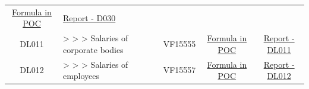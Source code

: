 \documentclass[]{book}
\begin{document}
\begin{longtable}[]{@{}cllccc@{}}
\begin{minipage}[t]{0.15\columnwidth}
\protect\hyperlink{d030---formula-in-poc}{Formula in POC}\strut
\end{minipage} & \begin{minipage}[t]{0.16\columnwidth}\centering
\href{./Auxiliary\%20Files/technical_reports/variable_report/D030(!).pdf}{Report - D030}\strut
\end{minipage}\tabularnewline
\begin{minipage}[t]{0.08\columnwidth}\centering
DL011\strut
\end{minipage} & \begin{minipage}[t]{0.20\columnwidth}\raggedright
\textgreater{} \textgreater{} \textgreater{} Salaries of corporate bodies\strut
\end{minipage} & \begin{minipage}[t]{0.16\columnwidth}\raggedright
\strut
\end{minipage} & \begin{minipage}[t]{0.09\columnwidth}\centering
VF15555\strut
\end{minipage} & \begin{minipage}[t]{0.15\columnwidth}\centering
\protect\hyperlink{dl011---formula-in-poc}{Formula in POC}\strut
\end{minipage} & \begin{minipage}[t]{0.16\columnwidth}\centering
\href{./Auxiliary\%20Files/technical_reports/variable_report/DL011(!).pdf}{Report - DL011}\strut
\end{minipage}\tabularnewline
\begin{minipage}[t]{0.08\columnwidth}\centering
DL012\strut
\end{minipage} & \begin{minipage}[t]{0.20\columnwidth}\raggedright
\textgreater{} \textgreater{} \textgreater{} Salaries of employees\strut
\end{minipage} & \begin{minipage}[t]{0.16\columnwidth}\raggedright
\strut
\end{minipage} & \begin{minipage}[t]{0.09\columnwidth}\centering
VF15557\strut
\end{minipage} & \begin{minipage}[t]{0.15\columnwidth}\centering
\protect\hyperlink{dl012---formula-in-poc}{Formula in POC}\strut
\end{minipage} & \begin{minipage}[t]{0.16\columnwidth}\centering
\href{./Auxiliary\%20Files/technical_reports/variable_report/DL012.pdf}{Report - DL012}\strut

\end{minipage}
\end{longtable}
\end{document}
